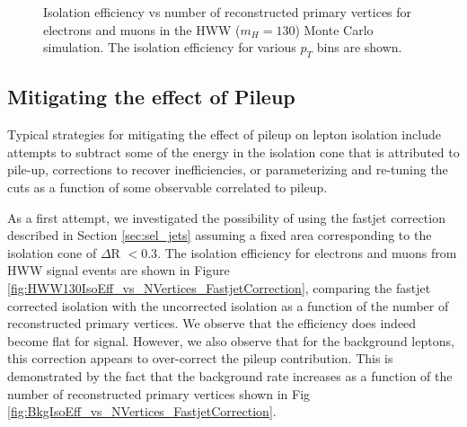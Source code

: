 \begin{figure}[!htbp]
\begin{center}
\caption{Isolation efficiency vs number of reconstructed primary vertices for electrons and muons
in the HWW ($m_{H} = 130$) Monte Carlo simulation. The isolation efficiency for various $p_{T}$ 
bins are shown.}
\label{fig:HWW130IsoEff_vs_NVertices}
\end{center}
\end{figure}





\subsection{Mitigating the effect of Pileup}

Typical strategies for mitigating the effect of pileup on lepton isolation include
attempts to subtract some of the energy in the isolation cone that is attributed to pile-up, 
corrections to recover inefficiencies, or parameterizing and re-tuning the cuts as a function 
of some observable correlated to pileup. 

As a first attempt, we investigated the possibility of using the fastjet correction described in 
Section \ref{sec:sel_jets} assuming a fixed area corresponding to the isolation cone of $\Delta$R $< 0.3$. 
The isolation efficiency for electrons and muons from HWW signal events are shown in 
Figure \ref{fig:HWW130IsoEff_vs_NVertices_FastjetCorrection}, comparing
the fastjet corrected isolation with the uncorrected isolation as a function of the 
number of reconstructed primary vertices. We observe that the efficiency does indeed become 
flat for signal. However, we also observe that for the background leptons, this correction appears
to over-correct the pileup contribution. This is demonstrated by the fact that the background rate increases
as a function of the number of reconstructed primary vertices shown in Fig 
\ref{fig:BkgIsoEff_vs_NVertices_FastjetCorrection}. 


